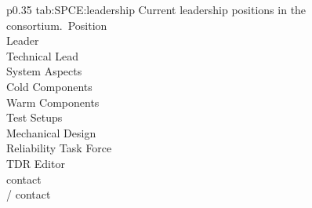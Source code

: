 \begin{dunetable}
{p{0.35\textwidth}}
{tab:SPCE:leadership}
{Current leadership positions in the  consortium.}\
Position \\ \toprowrule
Leader \\ \colhline 
Technical Lead \\ \colhline 
System Aspects \\ \colhline 
Cold Components \\ \colhline 
Warm Components \\ \colhline 
Test Setups \\ \colhline 
Mechanical Design \\ \colhline 
Reliability Task Force \\ \colhline 
TDR Editor \\ \colhline 
{} contact \\ \colhline 
{}/ contact \\ \colhline 
\end{dunetable}


